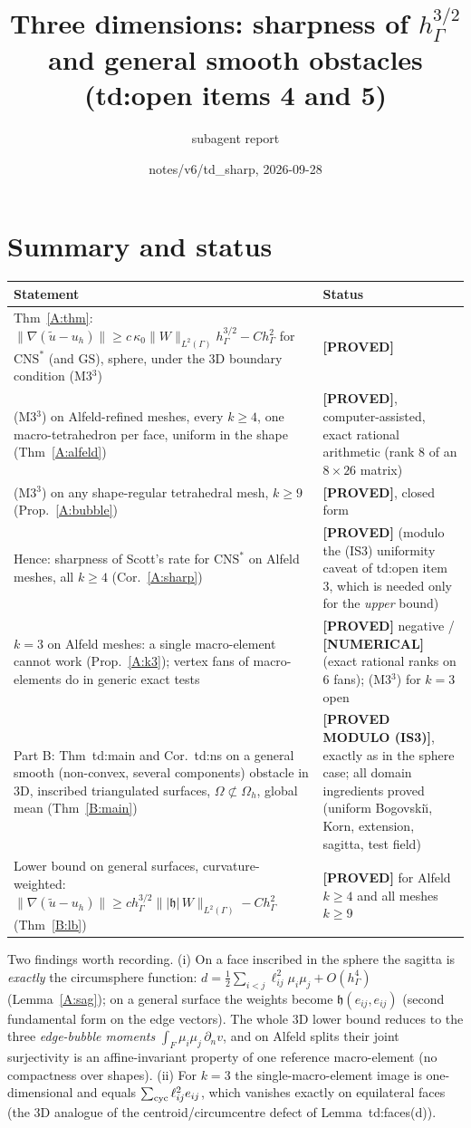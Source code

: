 \documentclass[11pt]{article}
\author{subagent report}
\title{Three dimensions: sharpness of $h_\Gamma^{3/2}$ and general smooth obstacles\\ \large (td:open items 4 and 5)}
\date{notes/v6/td\_sharp, 2026-09-28}
\theoremstyle{definition}
\newcommand{\hG}{h_\Gamma}
\newcommand{\Oh}{\Omega_h}
\newcommand{\dn}{\partial_n}
\newcommand{\ut}{\tilde u}
\newcommand{\norm}[1]{\lVert #1\rVert}
\newcommand{\GS}{\mathrm{GS}}
\newcommand{\CNS}{\mathrm{CNS}^\ast}
\newcommand{\hh}{\mathfrak h}
\newcommand{\status}[1]{\textbf{[#1]}}
\begin{document}
\maketitle

\section*{Summary and status}
\begin{center}
\begin{tabular}{p{}p{}}
\toprule
Statement & Status\\
\midrule
Thm~\ref{A:thm}: $\norm{\nabla(\ut-u_h)}\ge c\,\kappa_0\norm{W}_{L^2(\Gamma)}\hG^{3/2}-C\hG^2$ for $\CNS$ (and $\GS$), sphere, under the 3D boundary condition (M3$^3$) & \status{PROVED}\\
(M3$^3$) on Alfeld-refined meshes, every $k\ge4$, one macro-tetrahedron per face, uniform in the shape (Thm~\ref{A:alfeld}) & \status{PROVED}, computer-assisted, exact rational arithmetic (rank $8$ of an $8\times26$ matrix)\\
(M3$^3$) on any shape-regular tetrahedral mesh, $k\ge9$ (Prop.~\ref{A:bubble}) & \status{PROVED}, closed form\\
Hence: sharpness of Scott's rate for $\CNS$ on Alfeld meshes, all $k\ge4$ (Cor.~\ref{A:sharp}) & \status{PROVED} (modulo the (IS3) uniformity caveat of td:open item 3, which is needed only for the \emph{upper} bound)\\
$k=3$ on Alfeld meshes: a single macro-element cannot work (Prop.~\ref{A:k3}); vertex fans of macro-elements do in generic exact tests & \status{PROVED} negative / \status{NUMERICAL} (exact rational ranks on 6 fans); (M3$^3$) for $k=3$ open\\
Part B: Thm~td:main and Cor.~td:ns on a general smooth (non-convex, several components) obstacle in 3D, inscribed triangulated surfaces, $\Omega\not\subset\Oh$, global mean (Thm~\ref{B:main}) & \status{PROVED MODULO (IS3)}, exactly as in the sphere case; all domain ingredients proved (uniform Bogovski\u{\i}, Korn, extension, sagitta, test field)\\
Lower bound on general surfaces, curvature-weighted: $\norm{\nabla(\ut-u_h)}\ge c\hG^{3/2}\norm{|\hh|\,W}_{L^2(\Gamma)}-C\hG^2$ (Thm~\ref{B:lb}) & \status{PROVED} for Alfeld $k\ge4$ and all meshes $k\ge9$\\
\bottomrule
\end{tabular}
\end{center}
Two findings worth recording. (i) On a face inscribed in the sphere the sagitta is \emph{exactly} the circumsphere function: $d=\tfrac12\sum_{i<j}\ell_{ij}^2\mu_i\mu_j+O(\hG^4)$ (Lemma~\ref{A:sag}); on a general surface the weights become $\hh(e_{ij},e_{ij})$ (second fundamental form on the edge vectors). The whole 3D lower bound reduces to the three \emph{edge-bubble moments} $\int_F\mu_i\mu_j\,\dn v$, and on Alfeld splits their joint surjectivity is an affine-invariant property of one reference macro-element (no compactness over shapes). (ii) For $k=3$ the single-macro-element image is one-dimensional and equals $\sum_{\rm cyc}\ell_{ij}^2e_{ij}$, which vanishes exactly on equilateral faces (the 3D analogue of the centroid/circumcentre defect of Lemma~td:faces(d)).
\end{document}
